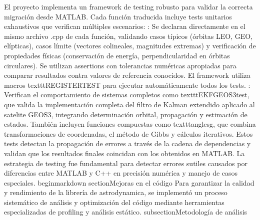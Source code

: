 \markdownRendererDocumentBegin
El proyecto implementa un framework de testing robusto para validar la correcta migración desde MATLAB. Cada función traducida incluye tests unitarios exhaustivos que verifican múltiples escenarios:\markdownRendererInterblockSeparator
{}: Se declaran directamente en el mismo archivo .cpp de cada función, validando casos típicos (órbitas LEO, GEO, elípticas), casos límite (vectores colineales, magnitudes extremas) y verificación de propiedades físicas (conservación de energía, perpendicularidad en órbitas circulares). Se utilizan assertions con tolerancias numéricas apropiadas para comparar resultados contra valores de referencia conocidos. El framework utiliza macros \markdownRendererBackslash{}texttt\markdownRendererLeftBrace{}REGISTER\markdownRendererUnderscore{}TEST\markdownRendererRightBrace{} para ejecutar automáticamente todos los tests.\markdownRendererInterblockSeparator
{}: Verifican el comportamiento de sistemas completos como \markdownRendererBackslash{}texttt\markdownRendererLeftBrace{}EKF\markdownRendererUnderscore{}GEOS3\markdownRendererUnderscore{}test\markdownRendererRightBrace{}, que valida la implementación completa del filtro de Kalman extendido aplicado al satelite GEOS3, integrando determinación orbital, propagación y estimación de estados. También incluyen funciones compuestas como \markdownRendererBackslash{}texttt\markdownRendererLeftBrace{}anglesg\markdownRendererRightBrace{}, que combina transformaciones de coordenadas, el método de Gibbs y cálculos iterativos. Estos tests detectan la propagación de errores a través de la cadena de dependencias y validan que los resultados finales coincidan con los obtenidos en MATLAB.\markdownRendererInterblockSeparator
{}La estrategia de testing fue fundamental para detectar errores sutiles causados por diferencias entre MATLAB y C++ en precisión numérica y manejo de casos especiales. \markdownRendererBackslash{}begin\markdownRendererLeftBrace{}markdown\markdownRendererRightBrace{}\markdownRendererInterblockSeparator
{}\markdownRendererBackslash{}section\markdownRendererLeftBrace{}Mejoras en el código\markdownRendererRightBrace{}\markdownRendererInterblockSeparator
{}Para garantizar la calidad y rendimiento de la librería de astrodynamica, se implementó un proceso sistemático de análisis y optimización del código mediante herramientas especializadas de profiling y análisis estático.\markdownRendererInterblockSeparator
{}\markdownRendererBackslash{}subsection\markdownRendererLeftBrace{}Metodología de análisis\markdownRendererRightBrace{}\markdownRendererInterblockSeparator
